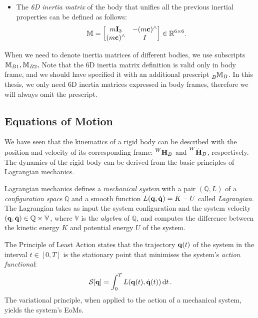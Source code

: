 \begin{itemize}
\item
The \emph{6D inertia matrix} of the body that unifies all the previous inertial properties can be defined as follows:
%
\begin{equation*}
   \masssix =
   \begin{bmatrix}
       m \eye_3 & -(m\mathbf{c})^\wedge \\
       (m\mathbf{c})^\wedge & I
   \end{bmatrix}
   \in \realn^{6\times6}
   .
\end{equation*}

\end{itemize}

\begin{remark*}
    When we need to denote inertia matrices of different bodies, we use subscripts $\masssix_{B1}, \masssix_{B2},$ \etc
    Note that the 6D inertia matrix definition is valid only in body frame, and we should have specified it with an additional prescript $\masssix[B]_B$.
    In this thesis, we only need 6D inertia matrices expressed in body frames, therefore we will always omit the prescript.
\end{remark*}

\subsection{Equations of Motion}
\label{sec:eom_rigid_body}

We have seen that the kinematics of a rigid body can be described with the position and velocity of its corresponding frame: $\homo[W]_B$ and $\homod[W]_B$, respectively.
The dynamics of the rigid body can be derived from the basic principles of Lagrangian mechanics.

\begin{definition*}
%
Lagrangian mechanics defines a \emph{mechanical system} with a pair $(\mathbb{Q}, L)$ of a \emph{configuration space} $\mathbb{Q}$ and a smooth function $L(\Qu, \Qud) = K - U$ called \emph{Lagrangian}.
The Lagrangian takes as input the system configuration and the system velocity $(\Qu, \Qud) \in \mathbb{Q} \times \mathbb{V}$,
where $\mathbb{V}$ is the \emph{algebra} of $\mathbb{Q}$, and computes the difference between the kinetic energy $K$ and potential energy $U$ of the system.
%
\end{definition*}

\begin{definition*}
%
The Principle of Least Action states that the trajectory $\Qu(t)$ of the system in the interval $t \in [0, T]$ is the stationary point that minimises the system's \emph{action functional}:
\begin{equation*}
    \mathcal{S}[\Qu] = \int_{0}^{T} L(\Qu(t), \Qud(t)) \dd{t}
    .
\end{equation*}
The variational principle, when applied to the action of a mechanical system, yields the system's \aclp{EoM}.
%
\end{definition*}

